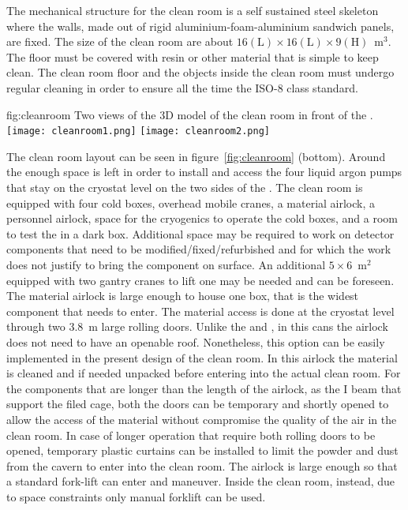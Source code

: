 The mechanical structure for the clean room is a self sustained steel skeleton where the walls, made out of rigid aluminium-foam-aluminium sandwich panels, are fixed.
The size of the clean room are about $16 \mathrm{(L)} \times 16 \mathrm{(L)} \times 9 \mathrm{(H)}$~m$^3$.
The floor must be covered with resin or other material that is simple to keep clean.
The clean room floor and the objects inside the clean room must undergo regular cleaning in order to ensure all the time the ISO-8 class standard.

\begin{dunefigure}{fig:cleanroom}
{Two views of the 3D model of the clean room in front of the .}
\texttt{[image: cleanroom1.png]}
\texttt{[image: cleanroom2.png]}
\end{dunefigure}

The clean room layout can be seen in figure~\ref{fig:cleanroom} (bottom).
Around the  enough space is left in order to install and access the four liquid argon pumps that stay on the cryostat level on the two sides of the .
The clean room is equipped with four cold boxes, overhead mobile cranes, a material airlock, a personnel airlock, space for the cryogenics to operate the cold boxes, and a room to test the  in a dark box.
Additional space may be required to work on detector components that need to be modified/fixed/refurbished and for which the work does not justify to bring the component on surface.
An additional $5\times6$~m$^2$ equipped with two gantry cranes to lift one  may be needed and can be foreseen.
The material airlock is large enough to house one  box, that is the widest component that needs to enter.
The material access is done at the cryostat level through two 3.8~m large rolling doors.
Unlike the  and , in this cans the airlock does not need to have an openable roof.
Nonetheless, this option can be easily implemented in the present design of the clean room.
In this airlock the material is cleaned and if needed unpacked before entering into the actual clean room.
For the components that are longer than the length of the airlock, as the I beam that support the filed cage, both the doors can be temporary and shortly opened to allow the access of the material without compromise the quality of the air in the clean room.
In case of longer operation that require both rolling doors to be opened, temporary plastic curtains can be installed to limit the powder and dust from the cavern to enter into the clean room.
The airlock is large enough so that a standard fork-lift can enter and maneuver.
Inside the clean room, instead, due to space constraints only manual forklift can be used.

